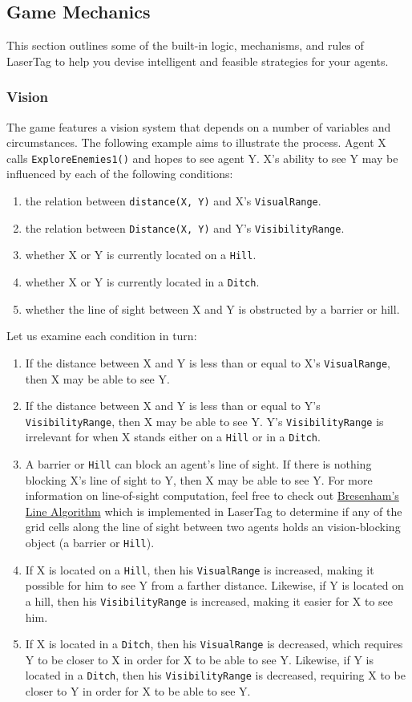 \documentclass[a4paper,english,DIV=16,11pt,parskip=half,dvipsnames,listof=totoc,index=totoc,bibliography=totoc]{scrartcl}
\begin{document}
\subsection{Game Mechanics} \label{ssec:gameMechs}
%
This section outlines some of the built-in logic, mechanisms, and rules of LaserTag to help you devise intelligent and feasible strategies for your agents.
%
\subsubsection{Vision} \label{sssec:vision}
The game features a vision system that depends on a number of variables and circumstances. The following example aims to illustrate the process. Agent X calls \texttt{ExploreEnemies1()} and hopes to see agent Y. X's ability to see Y may be influenced by each of the following conditions:
%
\begin{enumerate}
  \item the relation between \texttt{distance(X, Y)} and X's \texttt{VisualRange}.
  \item the relation between \texttt{Distance(X, Y)} and Y's \texttt{VisibilityRange}.
  \item whether X or Y is currently located on a \texttt{Hill}.
  \item whether X or Y is currently located in a \texttt{Ditch}.
  \item whether the line of sight between X and Y is obstructed by a barrier or hill.
\end{enumerate}
%
Let us examine each condition in turn:
%
\begin{enumerate}
  \item If the distance between X and Y is less than or equal to X's \texttt{VisualRange}, then X may be able to see Y.
  \item If the distance between X and Y is less than or equal to Y's \texttt{VisibilityRange}, then X may be able to see Y. Y's \texttt{VisibilityRange} is irrelevant for when X stands either on a \texttt{Hill} or in a \texttt{Ditch}.
  \item A barrier or \texttt{Hill} can block an agent's line of sight. If there is nothing blocking X's line of sight to Y, then X may be able to see Y. For more information on line-of-sight computation, feel free to check out \href{http://tech-algorithm.com/articles/drawing-line-using-bresenham-algorithm/}{Bresenham's Line Algorithm} which is implemented in LaserTag to determine if any of the grid cells along the line of sight between two agents holds an vision-blocking object (a barrier or \texttt{Hill}).
  \item If X is located on a \texttt{Hill}, then his \texttt{VisualRange} is increased, making it possible for him to see Y from a farther distance. Likewise, if Y is located on a hill, then his \texttt{VisibilityRange} is increased, making it easier for X to see him.
  \item If X is located in a \texttt{Ditch}, then his \texttt{VisualRange} is decreased, which requires Y to be closer to X in order for X to be able to see Y. Likewise, if Y is located in a \texttt{Ditch}, then his \texttt{VisibilityRange} is decreased, requiring X to be closer to Y in order for X to be able to see Y.
\end{enumerate}
\end{document}
